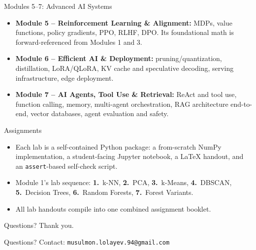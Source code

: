 \begin{frame}{Modules 5--7: Advanced AI Systems}
\begin{itemize}
  \item \textbf{Module 5 -- Reinforcement Learning \& Alignment:} MDPs, value functions, policy gradients, PPO, RLHF, DPO. Its foundational math is forward-referenced from Modules 1 and 3.
  \pause
  \item \textbf{Module 6 -- Efficient AI \& Deployment:} pruning/quantization, distillation, LoRA/QLoRA, KV cache and speculative decoding, serving infrastructure, edge deployment.
  \pause
  \item \textbf{Module 7 -- AI Agents, Tool Use \& Retrieval:} ReAct and tool use, function calling, memory, multi-agent orchestration, RAG architecture end-to-end, vector databases, agent evaluation and safety.
\end{itemize}
\end{frame}

\begin{frame}{Assignments}
\begin{itemize}
  \item Each lab is a self-contained Python package: a from-scratch NumPy implementation, a student-facing Jupyter notebook, a LaTeX handout, and an \texttt{assert}-based self-check script.
  \pause
  \item Module 1's lab sequence: \textbf{1.}~k-NN, \textbf{2.}~PCA, \textbf{3.}~k-Means, \textbf{4.}~DBSCAN, \textbf{5.}~Decision Trees, \textbf{6.}~Random Forests, \textbf{7.}~Forest Variants.
  \pause
  \item All lab handouts compile into one combined assignment booklet.
\end{itemize}
\end{frame}

\begin{frame}{Questions?}
\centering
\vspace{1cm}
{\Large Thank you.}

\vspace{0.5cm}
\normalsize
Questions? Contact: \texttt{musulmon.lolayev.94@gmail.com}
\end{frame}
